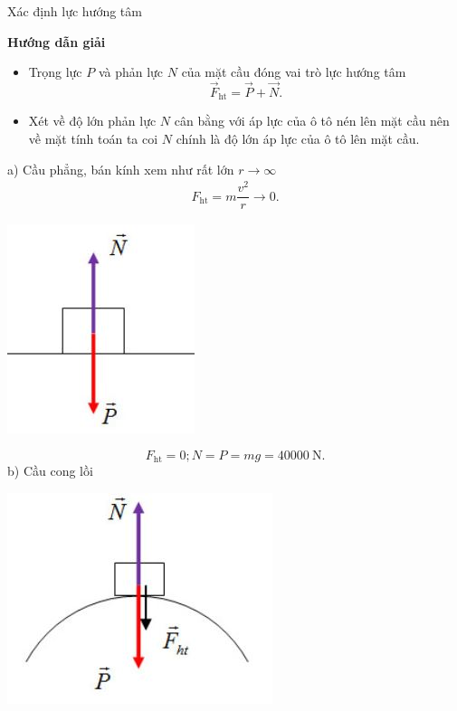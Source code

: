 \begin{dang}{Xác định lực hướng tâm}
	{	\begin{center}
			\textbf{Hướng dẫn giải}
		\end{center}
		
		\begin{itemize}
			\item Trọng lực $P$ và phản lực $N$ của mặt cầu đóng vai trò lực hướng tâm 
			\begin{equation*}
				\vec{F}_{\text{ht}} = \vec{P} +\vec{N}.
			\end{equation*}
			\item Xét về độ lớn phản lực $N$ cân bằng với áp lực của ô tô nén lên mặt cầu nên về mặt tính toán ta coi $N$ chính là độ lớn áp lực của ô tô lên mặt cầu.
		\end{itemize}
		a) Cầu phẳng, bán kính xem như rất lớn $r\to \infty$
		\begin{align*}
			F_\text{ht}=m\dfrac{v^2}{r}\to0.
		\end{align*}
		\begin{center}
			\includegraphics[scale=0.5]{../figs/VN10-PH-16-L-013-1-V2-01.JPG}
		\end{center}
		\begin{equation*}
			F_{\text{ht}} =0; N=P=mg=40000\ \text{N}.
		\end{equation*}
		b) Cầu cong lồi
		\begin{center}
			\includegraphics[scale=0.5]{../figs/VN10-PH-16-L-013-1-V2-02.JPG}

\end{center}}
\end{dang}
